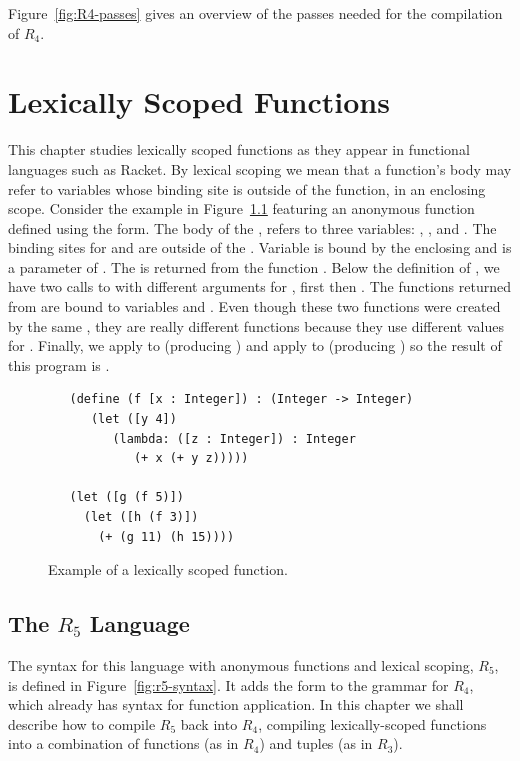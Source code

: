 \documentclass[11pt]{book}
\begin{document}
Figure~\ref{fig:R4-passes} gives an overview of the passes needed for
the compilation of $R_4$.


\chapter{Lexically Scoped Functions}
\label{ch:lambdas}

This chapter studies lexically scoped functions as they appear in
functional languages such as Racket. By lexical scoping we mean that a
function's body may refer to variables whose binding site is outside
of the function, in an enclosing scope.
%
Consider the example in Figure~\ref{fig:lexical-scoping} featuring an
anonymous function defined using the  form.  The body of
the , refers to three variables: , , and
. The binding sites for  and  are outside of
the . Variable  is bound by the enclosing
 and  is a parameter of . The  is
returned from the function . Below the definition of ,
we have two calls to  with different arguments for ,
first  then . The functions returned from  are
bound to variables  and . Even though these two
functions were created by the same , they are really
different functions because they use different values for
. Finally, we apply  to  (producing
) and apply  to  (producing ) so
the result of this program is .

\begin{figure}[btp]
\begin{lstlisting}
   (define (f [x : Integer]) : (Integer -> Integer)
      (let ([y 4])
         (lambda: ([z : Integer]) : Integer
            (+ x (+ y z)))))

   (let ([g (f 5)])
     (let ([h (f 3)])
       (+ (g 11) (h 15))))
\end{lstlisting}
\caption{Example of a lexically scoped function.}
\label{fig:lexical-scoping}
\end{figure}


\section{The $R_5$ Language}

The syntax for this language with anonymous functions and lexical
scoping, $R_5$, is defined in Figure~\ref{fig:r5-syntax}. It adds the
 form to the grammar for $R_4$, which already has syntax
for function application.  In this chapter we shall describe how to
compile $R_5$ back into $R_4$, compiling lexically-scoped functions
into a combination of functions (as in $R_4$) and tuples (as in
$R_3$).
\end{document}
